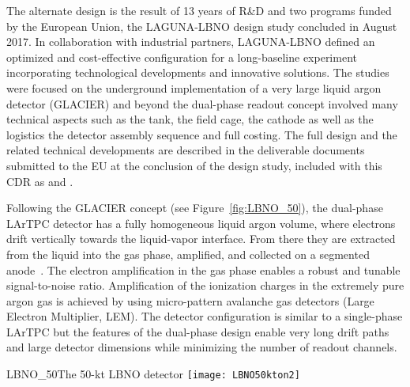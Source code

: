 The alternate design is the result of 13 years of R\&D and two
programs funded by the European Union, the LAGUNA-LBNO design study
concluded in August 2017.  In collaboration with industrial partners,
LAGUNA-LBNO defined an optimized and cost-effective configuration for
a long-baseline experiment incorporating technological developments
and innovative solutions. The studies were focused on the underground
implementation of a very large liquid argon detector (GLACIER) and
beyond the dual-phase readout concept involved many technical aspects
such as the tank, the field cage, the cathode as well as the logistics
the detector assembly sequence and full costing. The full design and
the related technical developments are described in the deliverable
documents submitted to the EU at the conclusion of the design study,
included with this CDR as \anxlbnoa and \anxlbnob.


Following the GLACIER concept \cite{LAGUNA-LBNO-deliv} (see
Figure~\ref{fig:LBNO_50}), the dual-phase LArTPC detector has a fully
homogeneous liquid argon volume, where electrons drift vertically
towards the liquid-vapor interface. From there they are extracted from
the liquid into the gas phase, amplified, and collected on a segmented
anode~\cite{Badertscher:2013wm,Badertscher:2012dq,Badertscher:2010zg}. The
electron amplification in the gas phase enables a robust and tunable
signal-to-noise ratio. Amplification of the ionization charges in the
extremely pure argon gas is achieved by using micro-pattern avalanche
gas detectors (Large Electron Multiplier, LEM). The detector
configuration is similar to a single-phase LArTPC but the features of
the dual-phase design enable very long drift paths and large detector
dimensions while minimizing the number of readout channels.
\begin{cdrfigure}{LBNO_50}{The 50-kt LBNO detector}
\texttt{[image: LBNO50kton2]}
\end{cdrfigure}

